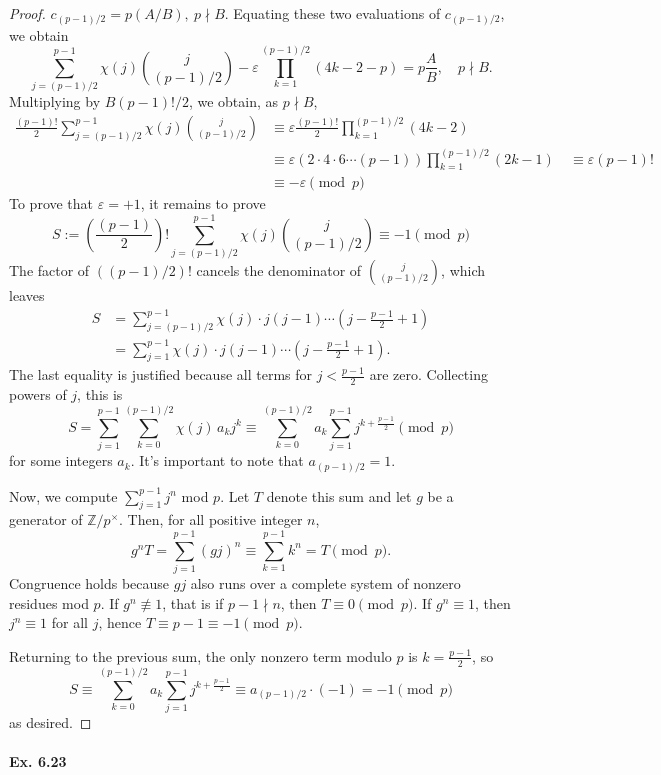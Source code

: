 \documentclass[11pt,a4paper]{article}
\newcommand{\Z}{\mathbb{Z}}
\begin{document}
\begin{proof}
$c_{(p-1)/2} = p (A/B),\ p \nmid B$. Equating these two evaluations of $c_{(p-1)/2}$, we obtain
$$\sum\limits_{j=(p-1)/2}^{p-1} \chi(j) \binom{j}{(p-1)/2} - \varepsilon  \prod_{k=1}^{(p-1)/2} (4k-2-p) = p \frac{A}{B}, \quad p \nmid B.$$
Multiplying by $B (p-1)!/2$, we obtain, as $p\nmid B$,
\begin{align*}
\frac{(p-1)!}{2}  \sum_{j=(p-1)/2}^{p-1} \chi(j) \binom{j}{(p-1)/2} &\equiv  \varepsilon  \frac{(p-1)!}{2} \prod_{k=1}^{(p-1)/2} (4k-2) \\
&\equiv \varepsilon ( 2\cdot 4\cdot6\cdots(p-1)) \prod_{k=1}^{(p-1)/2} (2k-1) \
&\equiv \varepsilon (p-1)!\\
&\equiv -\varepsilon \pmod p
\end{align*}
To prove that $\varepsilon = +1$, it remains to prove
$$S:=\left(\frac{(p-1)}{2}\right)!  \sum_{j=(p-1)/2}^{p-1} \chi(j) \binom{j}{(p-1)/2} \equiv -1 \pmod p$$
The factor of $((p-1)/2)!$ cancels the denominator of $\binom j{(p-1)/2}$, which leaves
\begin{align*}
S &= \sum_{j=(p-1)/2}^{p-1} \chi(j) \cdot j (j-1) \cdots (j-\frac{p-1}{2} + 1)\\
&=\sum_{j=1}^{p-1} \chi(j) \cdot j (j-1) \cdots (j-\frac{p-1}{2} + 1).
\end{align*}
The last equality is justified because all terms for $j < \frac{p-1}{2}$ are zero. Collecting powers of $j$, this is
$$S = \sum_{j=1}^{p-1} \sum_{k=0}^{(p-1)/2} \chi(j) \, a_k j^k \equiv \sum_{k=0}^{(p-1)/2} a_k \sum_{j=1}^{p-1} j^{k + \frac{p-1}{2}} \pmod p$$
for some integers $a_k$. It's important to note that $a_{(p-1)/2} = 1$.

Now, we compute $\sum_{j=1}^{p-1} j^n$ mod $p$. Let $T$ denote this sum and let $g$ be a generator of $\Z/p^\times$. Then, for all positive integer $n$,
$$g^n T = \sum_{j=1}^{p-1} (gj)^n \equiv \sum_{k=1}^{p-1} k^n = T \pmod p.$$
Congruence holds because $gj$ also runs over a complete system of nonzero residues mod $p$. If $g^n \not \equiv 1$, that is if $p-1 \nmid n$, then $T \equiv 0 \pmod p$. If $g^n \equiv 1$, then $j^n \equiv 1$ for all $j$, hence $T \equiv p-1 \equiv -1 \pmod p$.

Returning to the previous sum, the only nonzero term modulo $p$ is $k = \frac{p-1}{2}$, so
$$S \equiv \sum_{k=0}^{(p-1)/2} a_k \sum_{j=1}^{p-1} j^{k + \frac{p-1}{2}} \equiv a_{(p-1)/2}\cdot (-1) = -1 \pmod p$$
as desired.
\end{proof}

\paragraph{Ex. 6.23}
\end{document}
